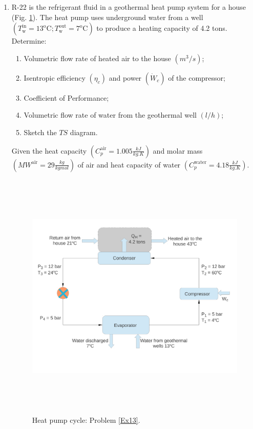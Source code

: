 \documentclass[12pts,a4paper,amsmath,amssymb,floatfix]{article}%
\begin{document}
\begin{enumerate}[label=\bfseries Problem \arabic*]
\item \label{Ex13} R-22 is the refrigerant fluid in a geothermal heat pump system for a house (Fig. \ref{Ex13:Fig}). The heat pump uses underground water from a well $\left(T_{\text{w}}^{\text{in}}=13^{\text{o}}\text{C}; T_{\text{w}}^{\text{out}}=7^{\text{o}}\text{C}\right)$ to produce a heating capacity of 4.2 tons. Determine:
\begin{enumerate}
 \item Volumetric flow rate of heated air to the house $\left(m^{3}/s\right)$;
 \item Isentropic efficiency $\left(\eta_{c}\right)$ and power $\left(\dot{W}_{c}\right)$ of the compressor;
 \item Coefficient of Performance;
 \item Volumetric flow rate of water from the geothermal well $\left(l/h\right)$;
 \item Sketch the $TS$ diagram.
\end{enumerate}
Given the heat capacity $\left(C_{p}^{\text{air}}=1.005\displaystyle\frac{kJ}{kg.K}\right)$ and molar mass $\left(MW^{\text{air}}=29\displaystyle\frac{kg}{kgmol}\right)$ of air and heat capacity of water $\left(C_{p}^{\text{water}}=4.18\displaystyle\frac{kJ}{kg.K}\right)$.

\begin{figure}[h]
\begin{center}
\includegraphics[width=16.0cm,height=12.0cm]{./Pics/Overview_Refrig42}
\end{center}
\caption{Heat pump cycle: Problem \ref{Ex13}.}\label{Ex13:Fig}
\end{figure}
 
\end{enumerate}
\end{document}
